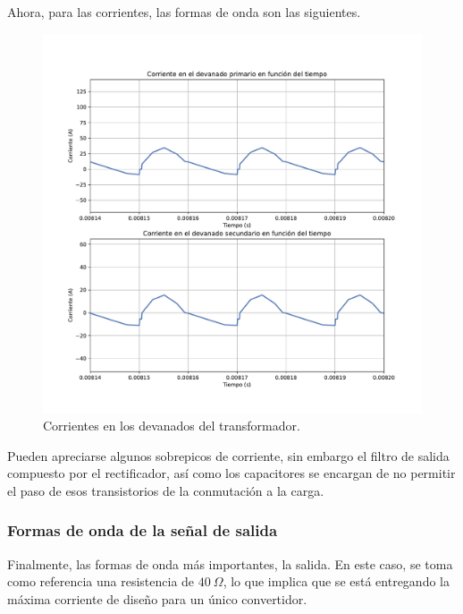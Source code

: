Ahora, para las corrientes, las formas de onda son las siguientes.

\begin{figure}
	\centering
	\includegraphics[width=1\linewidth]{../corrientes_transformador}
	\caption{Corrientes en los devanados del transformador.}
	\label{fig:corrientestransformador}
\end{figure}

Pueden apreciarse algunos sobrepicos de corriente, sin embargo el filtro de salida compuesto por el rectificador, así como los capacitores se encargan de no permitir el paso de esos transistorios de la conmutación a la carga.


\subsubsection{Formas de onda de la señal de salida}

Finalmente, las formas de onda más importantes, la salida. En este caso, se toma como referencia una resistencia de $40 \ \Omega$, lo que implica que se está entregando la máxima corriente de diseño para un único convertidor.

